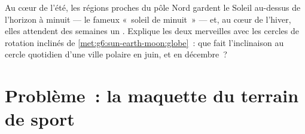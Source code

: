 \begin{exercise}[$\star\star\star$]\label{exo:g6:sun-earth-moon:12}
Au cœur de l'été, les régions proches du pôle Nord gardent le Soleil
au-dessus de l'horizon à minuit --- le fameux «~soleil de minuit~»
--- et, au cœur de l'hiver, elles attendent des semaines un . Explique les deux merveilles avec les cercles de rotation
inclinés de \cref{met:g6:sun-earth-moon:globe}~: que fait
l'inclinaison au cercle quotidien d'une ville polaire en juin, et en
décembre~?
\end{exercise}

\section{Problème~: la maquette du terrain de sport}

